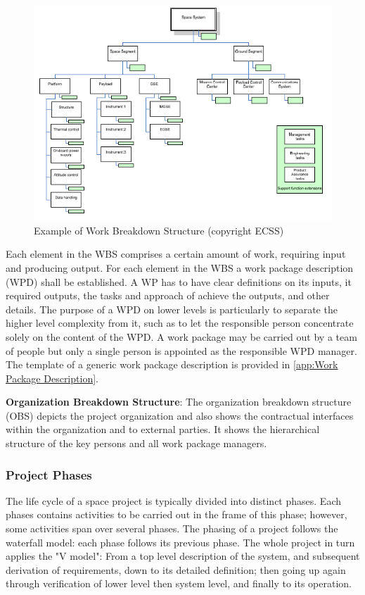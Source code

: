 \begin{figure}[h]
\centering\includegraphics[scale=1.0]{fig/example_of_work_breakdown_structure}
\caption{Example of Work Breakdown Structure (copyright ECSS)}
\label{fig:Example of Work Breakdown Structure}
\end{figure}

Each element in the WBS comprises a certain amount of work, requiring input and producing output. For each element in the WBS a work package description (WPD) shall be established. A WP has to have clear definitions on its inputs, it required outputs, the tasks and approach of achieve the outputs, and other details. The purpose of a WPD on lower levels is particularly to separate the higher level complexity from it, such as to let the responsible person concentrate solely on the content of the WPD. A work package may be carried out by a team of people but only a single person is appointed as the responsible WPD manager. The template of a generic work package description is provided in \ref{app:Work Package Description}.

\textbf{Organization Breakdown Structure}: The organization breakdown structure (OBS) depicts the project organization and also shows the contractual interfaces within the organization and to external parties. It shows the hierarchical structure of the key persons and all work package managers.

\subsubsection{Project Phases}

The life cycle of a space project is typically divided into distinct phases. Each phases contains activities to be carried out in the frame of this phase; however, some activities span over several phases. The phasing of a project follows the waterfall model: each phase follows its previous phase. The whole project in turn applies the "V model": From a top level description of the system, and subsequent derivation of requirements, down to its detailed definition; then going up again through verification of lower level then system level, and finally to its operation.

